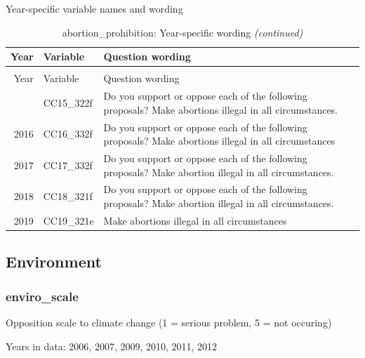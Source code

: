 \documentclass[12pt]{article}
\begin{document}
Year-specific variable names and wording

\begin{longtable}[t]{rl>{\raggedright\arraybackslash}p{10cm}}
\caption{\label{tab:unnamed-chunk-4}abortion\_prohibition: Year-specific wording}\\
\toprule
Year & Variable & Question wording\\
\midrule
\endfirsthead
\caption[]{abortion\_prohibition: Year-specific wording \textit{(continued)}}\\
\toprule
Year & Variable & Question wording\\
\midrule
\endhead
\
\endfoot
\bottomrule
\endlastfoot
2015 & CC15\_322f & Do you support or oppose each of the following proposals? Make abortions illegal in all circumstances.\\
2016 & CC16\_332f & Do you support or oppose each of the following proposals? Make abortions illegal in all circumstances\\
2017 & CC17\_332f & Do you support or oppose each of the following proposals? Make abortion illegal in all circumstances.\\
2018 & CC18\_321f & Do you support or oppose each of the following proposals? Make abortion illegal in all circumstances.\\
2019 & CC19\_321e & Make abortions illegal in all circumstances\\*
\end{longtable}\newpage

\subsection{Environment}\label{environment}

\subsubsection{enviro\_scale}\label{enviro_scale}

Opposition scale to climate change (1 = serious problem, 5 = not
occuring)

Years in data: 2006, 2007, 2009, 2010, 2011, 2012
\end{document}
